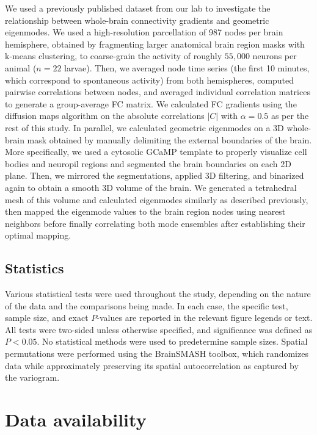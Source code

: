 \documentclass{article}
\begin{document}
We used a previously published dataset from our lab\cite{legare2024structural} to investigate the relationship between whole-brain connectivity gradients and geometric eigenmodes. We used a high-resolution parcellation of 987 nodes per brain hemisphere, obtained by fragmenting larger anatomical brain region masks with k-means clustering, to coarse-grain the activity of roughly $55,000$ neurons per animal ($n=22$ larvae). Then, we averaged node time series (the first 10 minutes, which correspond to spontaneous activity) from both hemispheres, computed pairwise correlations between nodes, and averaged individual correlation matrices to generate a group-average FC matrix. We calculated FC gradients using the diffusion maps algorithm on the absolute correlations $|C|$ with $\alpha=0.5$ as per the rest of this study. In parallel, we calculated geometric eigenmodes on a 3D whole-brain mask obtained by manually delimiting the external boundaries of the brain. More specifically, we used a cytosolic GCaMP template to properly visualize cell bodies and neuropil regions and segmented the brain boundaries on each 2D plane. Then, we mirrored the segmentations, applied 3D filtering, and binarized again to obtain a smooth 3D volume of the brain. We generated a tetrahedral mesh of this volume and calculated eigenmodes similarly as described previously, then mapped the eigenmode values to the brain region nodes using nearest neighbors before finally correlating both mode ensembles after establishing their optimal mapping.

\subsection*{Statistics}

Various statistical tests were used throughout the study, depending on the nature of the data and the comparisons being made. In each case, the specific test, sample size, and exact $P$-values are reported in the relevant figure legends or text. All tests were two-sided unless otherwise specified, and significance was defined as $P<0.05$. No statistical methods were used to predetermine sample sizes. Spatial permutations were performed using the BrainSMASH toolbox, which randomizes data while approximately preserving its spatial autocorrelation as captured by the variogram.

\section*{Data availability}
\end{document}
